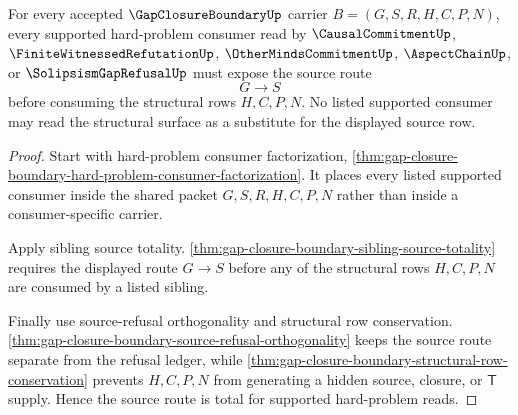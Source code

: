 \begin{theorem}
\label{thm:gap-closure-boundary-source-route-totality}
For every accepted $\GapClosureBoundaryUp$ carrier $B=(G,S,R,H,C,P,N)$, every supported hard-problem consumer read by $\CausalCommitmentUp$, $\FiniteWitnessedRefutationUp$, $\OtherMindsCommitmentUp$, $\AspectChainUp$, or $\SolipsismGapRefusalUp$ must expose the source route
$$
G \longrightarrow S
$$
before consuming the structural rows $H,C,P,N$. No listed supported consumer may read the structural surface as a substitute for the displayed source row.
\end{theorem}
\begin{proof}
Start with hard-problem consumer factorization, \autoref{thm:gap-closure-boundary-hard-problem-consumer-factorization}. It places every listed supported consumer inside the shared packet $G,S,R,H,C,P,N$ rather than inside a consumer-specific carrier.

Apply sibling source totality. \autoref{thm:gap-closure-boundary-sibling-source-totality} requires the displayed route $G \longrightarrow S$ before any of the structural rows $H,C,P,N$ are consumed by a listed sibling.

Finally use source-refusal orthogonality and structural row conservation. \autoref{thm:gap-closure-boundary-source-refusal-orthogonality} keeps the source route separate from the refusal ledger, while \autoref{thm:gap-closure-boundary-structural-row-conservation} prevents $H,C,P,N$ from generating a hidden source, closure, or $\mathsf{T}$ supply. Hence the source route is total for supported hard-problem reads.
\end{proof}


